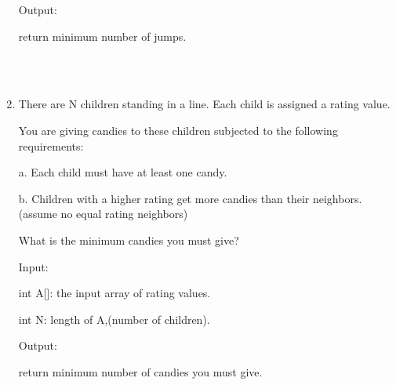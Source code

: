 \documentclass[12pt,a4paper]{article}
\begin{document}
\begin{enumerate}
Output:

return minimum number of jumps.


~\\
~\\


\item There are N children standing in a line. Each child is assigned a rating value.

You are giving candies to these children subjected to the following requirements:

a. Each child must have at least one candy.

b. Children with a higher rating get more candies than their neighbors.(assume no equal rating neighbors)

What is the minimum candies you must give?

Input:

int A[]: the input array of rating values.

int N: length of A,(number of children).

Output:

return minimum number of candies you must give.


~\\
~\\

\end{enumerate}
\end{document}
